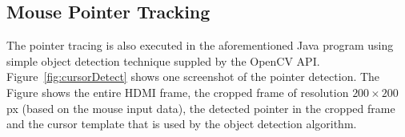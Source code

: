 \subsection{Mouse Pointer Tracking}



The pointer tracing is also executed in the aforementioned Java program using simple object detection technique suppled by the OpenCV API. Figure~\ref{fig:cursorDetect} shows one screenshot of the pointer detection. The Figure shows the entire HDMI frame, the cropped frame of resolution $200 \times 200$ px (based on the mouse input data), the detected pointer in the cropped frame and the cursor template that is used by the object detection algorithm.



